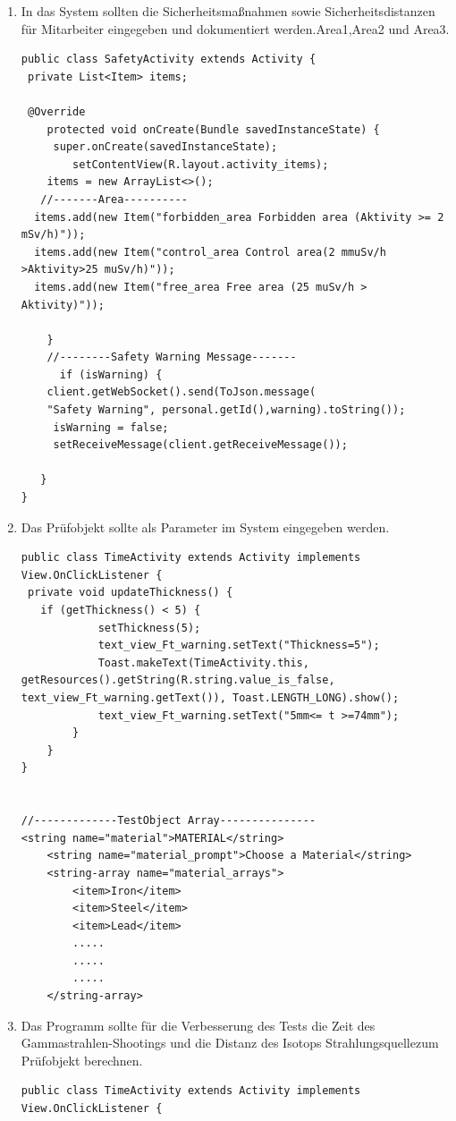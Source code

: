 \begin{enumerate}
\begin{lstlisting}[frame=single]
\end{lstlisting}
\item In das System sollten die Sicherheitsmaßnahmen sowie Sicherheitsdistanzen für Mitarbeiter
eingegeben und dokumentiert werden.Area1,Area2 und Area3.
\begin{lstlisting}[frame=single]
public class SafetyActivity extends Activity {
 private List<Item> items;
 
 @Override
    protected void onCreate(Bundle savedInstanceState) {
     super.onCreate(savedInstanceState);
        setContentView(R.layout.activity_items);
    items = new ArrayList<>();
   //-------Area----------
  items.add(new Item("forbidden_area Forbidden area (Aktivity >= 2 mSv/h)"));
  items.add(new Item("control_area Control area(2 mmuSv/h >Aktivity>25 muSv/h)"));
  items.add(new Item("free_area Free area (25 muSv/h > Aktivity)"));

    }
    //--------Safety Warning Message-------
      if (isWarning) {
    client.getWebSocket().send(ToJson.message(
    "Safety Warning", personal.getId(),warning).toString());
     isWarning = false;
     setReceiveMessage(client.getReceiveMessage());
                            
   }
}
\end{lstlisting}
\item Das Prüfobjekt sollte als Parameter im System eingegeben werden.
\begin{lstlisting}[frame=single]
public class TimeActivity extends Activity implements View.OnClickListener {
 private void updateThickness() {
   if (getThickness() < 5) {
            setThickness(5);
            text_view_Ft_warning.setText("Thickness=5");
            Toast.makeText(TimeActivity.this, getResources().getString(R.string.value_is_false, text_view_Ft_warning.getText()), Toast.LENGTH_LONG).show();
            text_view_Ft_warning.setText("5mm<= t >=74mm");
        }
    }
}


//-------------TestObject Array---------------
<string name="material">MATERIAL</string>
    <string name="material_prompt">Choose a Material</string>
    <string-array name="material_arrays">
        <item>Iron</item>
        <item>Steel</item>
        <item>Lead</item>
        .....
        .....
        .....
    </string-array>
\end{lstlisting}

\item Das Programm sollte für die Verbesserung des Tests die Zeit des Gammastrahlen-Shootings
und die Distanz des Isotops \grqq Strahlungsquelle\grqq zum Prüfobjekt berechnen.
\begin{lstlisting}[frame=single]
public class TimeActivity extends Activity implements View.OnClickListener {


\end{lstlisting}
\end{enumerate}
